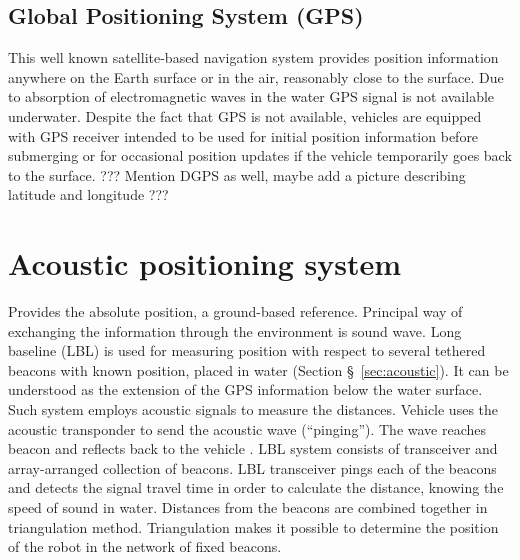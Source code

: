 \subsection{Global Positioning System (GPS)}
This well known satellite-based navigation system provides position information anywhere on the Earth surface or in the air, reasonably close to the surface. Due to absorption of electromagnetic waves in the water GPS signal is not available underwater. Despite the fact that GPS is not available, vehicles are equipped with GPS receiver intended to be used for initial position information before submerging or for occasional position updates if the vehicle temporarily goes back to the surface.
??? Mention DGPS as well, maybe add a picture describing latitude and longitude ???
\section{Acoustic positioning system}
Provides the absolute position, a ground-based reference. Principal way of exchanging the information through the environment is sound wave. Long baseline (LBL) is used for measuring position with respect to several tethered beacons with known position, placed in water (Section \S~\ref{sec:acoustic}). It can be understood as the extension of the GPS information below the water surface. Such system employs acoustic signals to measure the distances. Vehicle uses the acoustic transponder to send the acoustic wave (``pinging''). The wave reaches beacon and reflects back to the vehicle . LBL system consists of transceiver and array-arranged collection of beacons. LBL transceiver pings each of the beacons and detects the signal travel time in order to calculate the distance, knowing the speed of sound in water. Distances from the beacons are combined together in triangulation method. Triangulation makes it possible to determine the position of the robot in the network of fixed beacons. 

